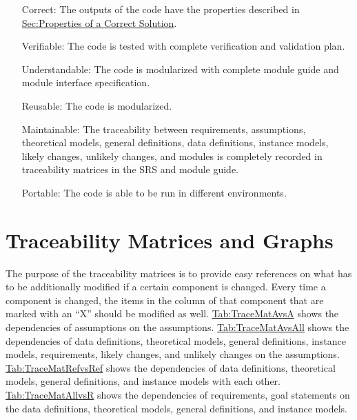 \documentclass[12pt]{article}
\begin{document}
\begin{itemize}
\item[Correct:\phantomsection\label{correct}]{The outputs of the code have the properties described in \hyperref[Sec:CorSolProps]{Sec:Properties of a Correct Solution}.}
\item[Verifiable:\phantomsection\label{verifiable}]{The code is tested with complete verification and validation plan.}
\item[Understandable:\phantomsection\label{understandable}]{The code is modularized with complete module guide and module interface specification.}
\item[Reusable:\phantomsection\label{reusable}]{The code is modularized.}
\item[Maintainable:\phantomsection\label{maintainable}]{The traceability between requirements, assumptions, theoretical models, general definitions, data definitions, instance models, likely changes, unlikely changes, and modules is completely recorded in traceability matrices in the SRS and module guide.}
\item[Portable:\phantomsection\label{portable}]{The code is able to be run in different environments.}
\end{itemize}
\section{Traceability Matrices and Graphs}
\label{Sec:TraceMatrices}
The purpose of the traceability matrices is to provide easy references on what has to be additionally modified if a certain component is changed. Every time a component is changed, the items in the column of that component that are marked with an ``X'' should be modified as well. \hyperref[Table:TraceMatAvsA]{Tab:TraceMatAvsA} shows the dependencies of assumptions on the assumptions. \hyperref[Table:TraceMatAvsAll]{Tab:TraceMatAvsAll} shows the dependencies of data definitions, theoretical models, general definitions, instance models, requirements, likely changes, and unlikely changes on the assumptions. \hyperref[Table:TraceMatRefvsRef]{Tab:TraceMatRefvsRef} shows the dependencies of data definitions, theoretical models, general definitions, and instance models with each other. \hyperref[Table:TraceMatAllvsR]{Tab:TraceMatAllvsR} shows the dependencies of requirements, goal statements on the data definitions, theoretical models, general definitions, and instance models.
\end{document}
